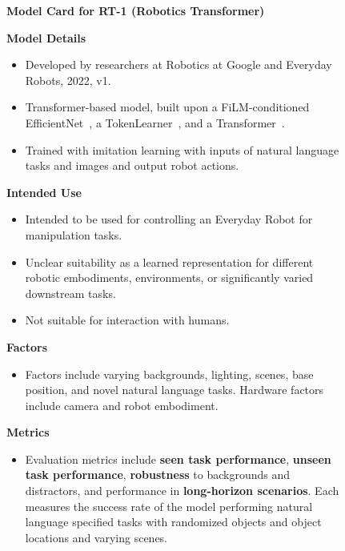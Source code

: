 \documentclass{article} %
\begin{document}
\begin{figure}
\raggedright
\begin{framed}
\begin{center}
\large{\textbf{Model Card for RT-1 (Robotics Transformer)}}
\end{center}
\textbf{Model Details}
\begin{itemize}[topsep=2pt,itemsep=-0.5ex,partopsep=1ex,parsep=1ex]
\item Developed by researchers at Robotics at Google and Everyday Robots, 2022, v1.
\item Transformer-based model, built upon a FiLM-conditioned EfficientNet~\citep{pmlr-v97-tan19a}, a TokenLearner~\citep{ryoo2021tokenlearner}, and a Transformer~\citep{vaswani2017attention}.
\item Trained with imitation learning with inputs of natural language tasks and images and output robot actions.
\end{itemize}
    
\textbf{Intended Use}
\begin{itemize}[topsep=2pt,itemsep=-0.5ex,partopsep=1ex,parsep=1ex]
\item Intended to be used for controlling an Everyday Robot for manipulation tasks.
\item Unclear suitability as a learned representation for different robotic embodiments, environments, or significantly varied downstream tasks.
\item Not suitable for interaction with humans.
\end{itemize}

\textbf{Factors}
\begin{itemize}[topsep=2pt,itemsep=-0.5ex,partopsep=1ex,parsep=1ex]
\item Factors include varying backgrounds, lighting, scenes, base position, and novel natural language tasks. Hardware factors include camera and robot embodiment.
\end{itemize}

\textbf{Metrics}
\begin{itemize}[topsep=2pt,itemsep=-0.5ex,partopsep=1ex,parsep=1ex]
    \item Evaluation metrics include \textbf{seen task performance}, \textbf{unseen task performance}, \textbf{robustness} to backgrounds and distractors, and performance in \textbf{long-horizon scenarios}. Each measures the success rate of the model performing natural language specified tasks with randomized objects and object locations and varying scenes. 
\end{itemize}


\end{framed}
\end{figure}
\end{document}
